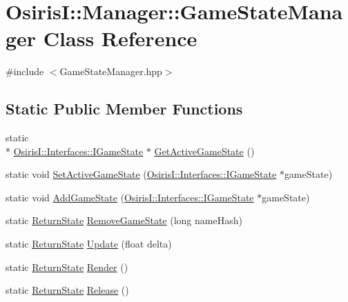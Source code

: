 \hypertarget{class_osiris_i_1_1_manager_1_1_game_state_manager}{\section{Osiris\-I\-:\-:Manager\-:\-:Game\-State\-Manager Class Reference}
\label{class_osiris_i_1_1_manager_1_1_game_state_manager}
}


{\ttfamily \#include $<$Game\-State\-Manager.\-hpp$>$}

\subsection*{Static Public Member Functions}
\begin{DoxyCompactItemize}
\item 
static \\*
\hyperlink{class_osiris_i_1_1_interfaces_1_1_i_game_state}{Osiris\-I\-::\-Interfaces\-::\-I\-Game\-State} $\ast$ \hyperlink{class_osiris_i_1_1_manager_1_1_game_state_manager_aefbc558a6895ef0f97ca175827ea8609}{Get\-Active\-Game\-State} ()
\item 
static void \hyperlink{class_osiris_i_1_1_manager_1_1_game_state_manager_aff03613d57a1ffc514c67a89727e0c95}{Set\-Active\-Game\-State} (\hyperlink{class_osiris_i_1_1_interfaces_1_1_i_game_state}{Osiris\-I\-::\-Interfaces\-::\-I\-Game\-State} $\ast$game\-State)
\item 
static void \hyperlink{class_osiris_i_1_1_manager_1_1_game_state_manager_adbcefe3c2bd77597436a4f6e222c7b7f}{Add\-Game\-State} (\hyperlink{class_osiris_i_1_1_interfaces_1_1_i_game_state}{Osiris\-I\-::\-Interfaces\-::\-I\-Game\-State} $\ast$game\-State)
\item 
static \hyperlink{namespace_osiris_i_a8f53bf938dc75c65c6a529694514013e}{Return\-State} \hyperlink{class_osiris_i_1_1_manager_1_1_game_state_manager_a3a31440e1ef2e78acf622c2eeb91281e}{Remove\-Game\-State} (long name\-Hash)
\item 
static \hyperlink{namespace_osiris_i_a8f53bf938dc75c65c6a529694514013e}{Return\-State} \hyperlink{class_osiris_i_1_1_manager_1_1_game_state_manager_ac882b66c4982e08c3dde62a7f7accd29}{Update} (float delta)
\item 
static \hyperlink{namespace_osiris_i_a8f53bf938dc75c65c6a529694514013e}{Return\-State} \hyperlink{class_osiris_i_1_1_manager_1_1_game_state_manager_a016a2449c646711334e9da61481bab72}{Render} ()
\item 
static \hyperlink{namespace_osiris_i_a8f53bf938dc75c65c6a529694514013e}{Return\-State} \hyperlink{class_osiris_i_1_1_manager_1_1_game_state_manager_a8ef56453a6d72d08f5aeb236bc3de418}{Release} ()
\end{DoxyCompactItemize}
